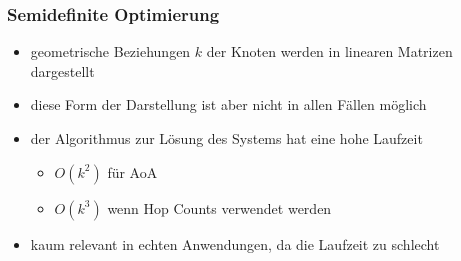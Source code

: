 \begin{frame}
  \frametitle{Semidefinite Optimierung}

  \begin{itemize}
  \item geometrische Beziehungen $k$ der Knoten werden in linearen Matrizen
    dargestellt
  \item diese Form der Darstellung ist aber nicht in allen Fällen
    möglich
  \item der Algorithmus zur Lösung des Systems hat eine hohe Laufzeit
    \begin{itemize}
    \item $O(k^2)$ für AoA
    \item $O(k^3)$ wenn Hop Counts verwendet werden
    \end{itemize}
  \item kaum relevant in echten Anwendungen, da die Laufzeit zu
    schlecht
  \end{itemize}
\end{frame}
